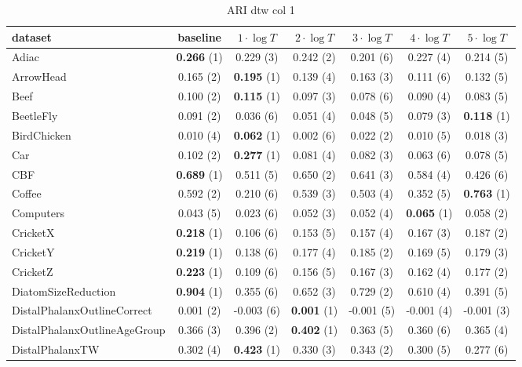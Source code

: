     \begin{table}[ht]
    \caption{ARI dtw col 1} 
    \begin{adjustbox}{width=\textwidth}
    \begin{tabular}{lcccccc}
    \hline
    dataset & baseline & \textbf{$1\cdot \log{T}$} & \textbf{$2\cdot \log{T}$} & \textbf{$3\cdot \log{T}$} & \textbf{$4\cdot \log{T}$} & \textbf{$5\cdot \log{T}$} \\ \hline
    Adiac & \textbf{0.266} (1) & 0.229 (3) & 0.242 (2) & 0.201 (6) & 0.227 (4) & 0.214 (5) \\
    ArrowHead & 0.165 (2) & \textbf{0.195} (1) & 0.139 (4) & 0.163 (3) & 0.111 (6) & 0.132 (5) \\
    Beef & 0.100 (2) & \textbf{0.115} (1) & 0.097 (3) & 0.078 (6) & 0.090 (4) & 0.083 (5) \\
    BeetleFly & 0.091 (2) & 0.036 (6) & 0.051 (4) & 0.048 (5) & 0.079 (3) & \textbf{0.118} (1) \\
    BirdChicken & 0.010 (4) & \textbf{0.062} (1) & 0.002 (6) & 0.022 (2) & 0.010 (5) & 0.018 (3) \\
    Car & 0.102 (2) & \textbf{0.277} (1) & 0.081 (4) & 0.082 (3) & 0.063 (6) & 0.078 (5) \\
    CBF & \textbf{0.689} (1) & 0.511 (5) & 0.650 (2) & 0.641 (3) & 0.584 (4) & 0.426 (6) \\
    Coffee & 0.592 (2) & 0.210 (6) & 0.539 (3) & 0.503 (4) & 0.352 (5) & \textbf{0.763} (1) \\
    Computers & 0.043 (5) & 0.023 (6) & 0.052 (3) & 0.052 (4) & \textbf{0.065} (1) & 0.058 (2) \\
    CricketX & \textbf{0.218} (1) & 0.106 (6) & 0.153 (5) & 0.157 (4) & 0.167 (3) & 0.187 (2) \\
    CricketY & \textbf{0.219} (1) & 0.138 (6) & 0.177 (4) & 0.185 (2) & 0.169 (5) & 0.179 (3) \\
    CricketZ & \textbf{0.223} (1) & 0.109 (6) & 0.156 (5) & 0.167 (3) & 0.162 (4) & 0.177 (2) \\
    DiatomSizeReduction & \textbf{0.904} (1) & 0.355 (6) & 0.652 (3) & 0.729 (2) & 0.610 (4) & 0.391 (5) \\
    DistalPhalanxOutlineCorrect & 0.001 (2) & -0.003 (6) & \textbf{0.001} (1) & -0.001 (5) & -0.001 (4) & -0.001 (3) \\
    DistalPhalanxOutlineAgeGroup & 0.366 (3) & 0.396 (2) & \textbf{0.402} (1) & 0.363 (5) & 0.360 (6) & 0.365 (4) \\
    DistalPhalanxTW & 0.302 (4) & \textbf{0.423} (1) & 0.330 (3) & 0.343 (2) & 0.300 (5) & 0.277 (6) \\

\end{tabular}
\end{adjustbox}
\end{table}
